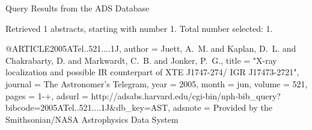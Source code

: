 Query Results from the ADS Database


Retrieved 1 abstracts, starting with number 1.  Total number selected: 1.

@ARTICLE{2005ATel..521....1J,
   author = {{Juett}, A.~M. and {Kaplan}, D.~L. and {Chakrabarty}, D. and 
	{Markwardt}, C.~B. and {Jonker}, P.~G.},
    title = "{X-ray localization and possible IR counterpart of XTE J1747-274/ IGR J17473-2721}",
  journal = {The Astronomer's Telegram},
     year = 2005,
    month = jun,
   volume = 521,
    pages = {1-+},
   adsurl = {http://adsabs.harvard.edu/cgi-bin/nph-bib_query?bibcode=2005ATel..521....1J&db_key=AST},
  adsnote = {Provided by the Smithsonian/NASA Astrophysics Data System}
}


